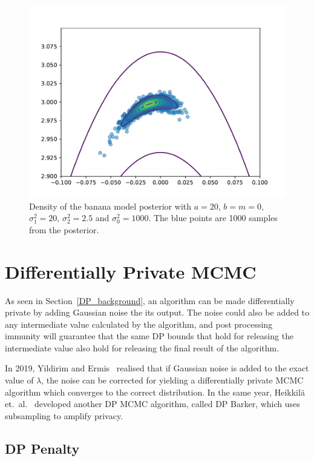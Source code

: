 \documentclass[english,twoside,openright]{HYgraduMLDS}
\begin{document}
\begin{figure}[h]
    \centering
    \includegraphics[width=\textwidth]{figures/banana_density}
    \caption{
        Density of the banana model posterior with \(a = 20\), \(b = m = 0\), 
        \(\sigma_1^2 = 20\), \(\sigma_2^2 = 2.5\) and \(\sigma_0^2 = 1000\).
        The blue points are 1000 samples from the posterior.
    }
    \label{banana_density_fig}
\end{figure}

\chapter{Differentially Private MCMC}

As seen in Section~\ref{DP_background}, an algorithm can be made differentially 
private by adding Gaussian noise the its output. The noise could also be added 
to any intermediate value calculated by the algorithm, and post processing immunity 
will guarantee that the same DP bounds that hold for releasing the intermediate 
value also hold for releasing the final result of the algorithm.

In 2019, Yildirim and Ermis~\cite{YildirimE19} realised that if Gaussian noise is added to 
the exact value of \(\lambda\), the noise can be corrected for 
yielding a differentially private MCMC algorithm which converges to 
the correct distribution. In the same year, Heikkilä et.\ al.~\cite{HeikkilaJDH19}
developed another DP MCMC algorithm, called DP Barker, which uses subsampling 
to amplify privacy.

\section{DP Penalty}
\end{document}
